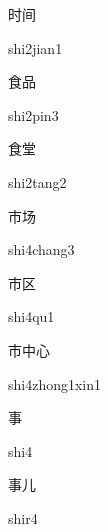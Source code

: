 \begin{verbete}{时间}
\begin{pronuncia}{shi2jian1}
\end{pronuncia}
\end{verbete}

\begin{verbete}{食品}
\begin{pronuncia}{shi2pin3}
\end{pronuncia}
\end{verbete}

\begin{verbete}{食堂}
\begin{pronuncia}{shi2tang2}
\end{pronuncia}
\end{verbete}

\begin{verbete}{市场}
\begin{pronuncia}{shi4chang3}
\end{pronuncia}
\end{verbete}

\begin{verbete}[shi4qu1]{市区}
\begin{pronuncia}{shi4qu1}
\end{pronuncia}
\end{verbete}

\begin{verbete}{市中心}
\begin{pronuncia}{shi4zhong1xin1}
\end{pronuncia}
\end{verbete}

\begin{verbete}[shi4]{事}
\begin{pronuncia}{shi4}
\end{pronuncia}
\end{verbete}

\begin{verbete}[shir4]{事儿}
\begin{pronuncia}{shir4}
\end{pronuncia}
\end{verbete}

